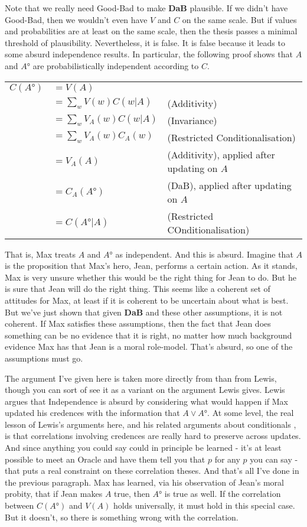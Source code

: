 \documentclass[11pt,]{book}
\def\toprule{}
\def\bottomrule{}
\begin{document}
Note that we really need Good-Bad to make \textbf{DaB} plausible. If we didn't have Good-Bad, then we wouldn't even have \(V\) and \(C\) on the same scale. But if values and probabilities are at least on the same scale, then the thesis passes a minimal threshold of plausibility. Nevertheless, it is false. It is false because it leads to some absurd independence results. In particular, the following proof shows that \(A\) and \(A°\) are probabilistically independent according to \(C\).

\begin{longtable}[]{@{}rll@{}}
\toprule
\endhead
\(C(A°)\) & \(=V(A)\) &\tabularnewline
& \(=\sum_w V(w)C(w | A)\) & (Additivity)\tabularnewline
& \(=\sum_w V_A(w)C(w | A)\) & (Invariance)\tabularnewline
& \(=\sum_w V_A(w)C_A(w)\) & (Restricted Conditionalisation)\tabularnewline
& \(=V_A(A)\) & (Additivity), applied after updating on \(A\)\tabularnewline
& \(=C_A(A°)\) & (DaB), applied after updating on \(A\)\tabularnewline
& \(=C(A° | A)\) & (Restricted COnditionalisation)\tabularnewline
\bottomrule
\end{longtable}

That is, Max treats \(A\) and \(A°\) as independent. And this is absurd. Imagine that \(A\) is the proposition that Max's hero, Jean, performs a certain action. As it stands, Max is very unsure whether this would be the right thing for Jean to do. But he is sure that Jean will do the right thing. This seems like a coherent set of attitudes for Max, at least if it is coherent to be uncertain about what is best. But we've just shown that given \textbf{DaB} and these other assumptions, it is not coherent. If Max satisfies these assumptions, then the fact that Jean does something can be no evidence that it is right, no matter how much background evidence Max has that Jean is a moral role-model. That's absurd, so one of the assumptions must go.

The argument I've given here is taken more directly from \citet{Nissan-Rozen2015-NISATR} than from Lewis, though you can sort of see it as a variant on the argument Lewis gives. Lewis argues that Independence is absurd by considering what would happen if Max updated his credences with the information that \(A \vee A°\). At some level, the real lesson of Lewis's arguments here, and his related arguments about conditionals \citep{Lewis1976b, Lewis1986h}, is that correlations involving credences are really hard to preserve across updates. And since anything you could say could in principle be learned - it's at least possible to meet an Oracle and have them tell you that \(p\) for any \(p\) you can say - that puts a real constraint on these correlation theses. And that's all I've done in the previous paragraph. Max has learned, via his observation of Jean's moral probity, that if Jean makes \(A\) true, then \(A°\) is true as well. If the correlation between \(C(A°)\) and \(V(A)\) holds universally, it must hold in this special case. But it doesn't, so there is something wrong with the correlation.
\end{document}
